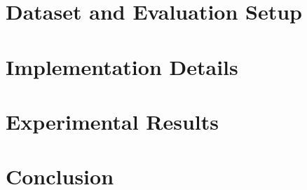 \documentclass[12pt,a4paper]{report}
\renewcommand{\bibname}{References}
\begin{document}
\chapter{Dataset and Evaluation Setup}


\chapter{Implementation Details}


\chapter{Experimental Results}


\chapter{Conclusion}


\clearpage
\renewcommand{\bibname}{References}


\end{document}

